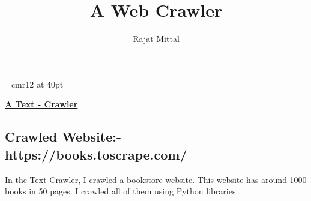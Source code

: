 \documentclass[11pt]{article}
\begin{document}
\begin{titlepage}
\font\myfont=cmr12 at 40pt
\author{\normalsize {Rajat Mittal}} 



\title{\myfont A Web Crawler}

\maketitle
{}
\end{titlepage}

\pagebreak
\centerline{\uline{\Large{\textbf{A Text - Crawler}}}}
\subsection*{Crawled Website:- https://books.toscrape.com/}

\hspace{1in}In the Text-Crawler, I crawled a bookstore website. This website has around 1000 books in 50 pages. I crawled all of them using Python libraries.
\\
\end{document}
